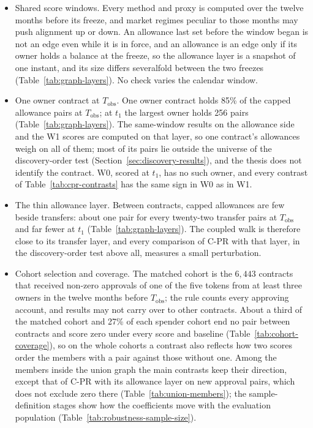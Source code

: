 \begin{itemize}
\item Shared score windows. Every method and proxy is computed over the twelve months before its freeze, and market regimes peculiar to those months may push alignment up or down. An allowance last set before the window began is not an edge even while it is in force, and an allowance is an edge only if its owner holds a balance at the freeze, so the allowance layer is a snapshot of one instant, and its size differs severalfold between the two freezes (Table~\ref{tab:graph-layers}). No check varies the calendar window.
\item One owner contract at $T_{\mathrm{obs}}$. One owner contract holds 85\% of the capped allowance pairs at $T_{\mathrm{obs}}$; at $t_1$ the largest owner holds 256 pairs (Table~\ref{tab:graph-layers}). The same-window results on the allowance side and the W1 scores are computed on that layer, so one contract's allowances weigh on all of them; most of its pairs lie outside the universe of the discovery-order test (Section~\ref{sec:discovery-results}), and the thesis does not identify the contract. W0, scored at $t_1$, has no such owner, and every contrast of Table~\ref{tab:cpr-contrasts} has the same sign in W0 as in W1.
\item The thin allowance layer. Between contracts, capped allowances are few beside transfers: about one pair for every twenty-two transfer pairs at $T_{\mathrm{obs}}$ and far fewer at $t_1$ (Table~\ref{tab:graph-layers}). The coupled walk is therefore close to its transfer layer, and every comparison of \mbox{C-PR} with that layer, in the discovery-order test above all, measures a small perturbation.
\item Cohort selection and coverage. The matched cohort is the $6{,}443$ contracts that received non-zero approvals of one of the five tokens from at least three owners in the twelve months before $T_{\mathrm{obs}}$; the rule counts every approving account, and results may not carry over to other contracts. About a third of the matched cohort and 27\% of each spender cohort end no pair between contracts and score zero under every score and baseline (Table~\ref{tab:cohort-coverage}), so on the whole cohorts a contrast also reflects how two scores order the members with a pair against those without one. Among the members inside the union graph the main contrasts keep their direction, except that of \mbox{C-PR} with its allowance layer on new approval pairs, which does not exclude zero there (Table~\ref{tab:union-members}); the sample-definition stages show how the coefficients move with the evaluation population (Table~\ref{tab:robustness-sample-size}).

\end{itemize}
